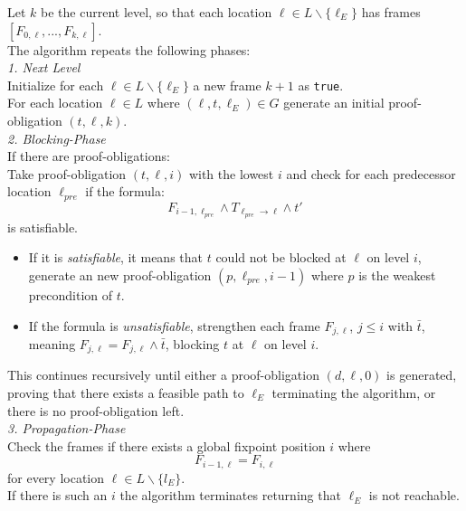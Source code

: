 \documentclass[11pt, a4paper, BCOR=10mm, ngerman, oneside]{scrbook}
\begin{document}
Let $k$ be the current level, so that each location $\ell \in L \backslash \{\ell_E\}$ has frames $[F_{0, \ell}, ..., F_{k, \ell}]$. \\
The algorithm repeats the following phases: \\

\textsl{1. Next Level} \\
Initialize for each $\ell \in L \backslash \{\ell_E\}$ a new frame $k + 1$ as \texttt{true}. \\
For each location $\ell \in L$ where $(\ell, t, \ell_E) \in G$ generate an initial proof-obligation $(t, \ell, k)$. \\ 

\textsl{2. Blocking-Phase} \\
If there are proof-obligations: \\
Take proof-obligation $(t, \ell, i)$ with the lowest $i$ and check for each predecessor location $\ell_{pre}$ if the formula: \\
\begin{equation*}
F_{i - 1, \ell_{pre}} \land T_{\ell_{pre} \rightarrow \ell} \land t'
\end{equation*}
is satisfiable.
\begin{itemize}
\item If it is \textsl{satisfiable}, it means that $t$ could not be blocked at $\ell$ on level $i$, generate an new proof-obligation $(p, \ell_{pre}, i-1)$ where $p$ is the weakest precondition of $t$.

\item If the formula is \textsl{unsatisfiable}, strengthen each frame $F_{j, \ell}$, $j \leq i$ with $\bar t$, meaning $F_{j, \ell} = F_{j, \ell} \land \bar t$, blocking $t$ at $\ell$ on level $i$.
\end{itemize}

This continues recursively until either a proof-obligation $(d, \ell, 0)$ is generated, proving that there exists a feasible path to $\ell_E$ terminating the algorithm, or there is no proof-obligation left. \\

\textsl{3. Propagation-Phase} \\
Check the frames if there exists a global fixpoint position $i$ where
\begin{equation*}
F_{i-1, \ell} = F_{i, \ell}
\end{equation*}
for every location $\ell \in L \backslash \{l_E \}$. \\
If there is such an $i$ the algorithm terminates returning that $\ell_E$ is not reachable.  \\ 
\end{document}
